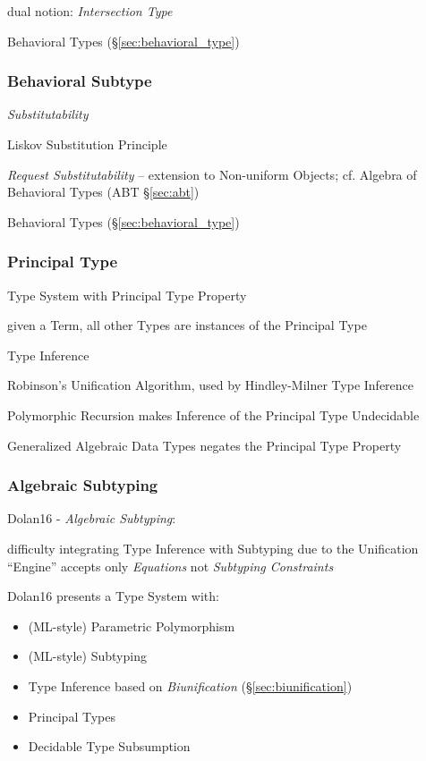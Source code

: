 
dual notion: \emph{Intersection Type}

\fist Behavioral Types (\S\ref{sec:behavioral_type})



\subsubsection{Behavioral Subtype}\label{sec:behavioral_subtype}

\emph{Substitutability}

Liskov Substitution Principle

\emph{Request Substitutability} -- extension to Non-uniform Objects;
cf. Algebra of Behavioral Types (ABT \S\ref{sec:abt})

\fist Behavioral Types (\S\ref{sec:behavioral_type})



\subsubsection{Principal Type}\label{sec:principal_type}

Type System with Principal Type Property

given a Term, all other Types are instances of the Principal Type

Type Inference

Robinson's Unification Algorithm, used by Hindley-Milner Type
Inference

Polymorphic Recursion makes Inference of the Principal Type Undecidable

Generalized Algebraic Data Types negates the Principal Type Property



\subsubsection{Algebraic Subtyping}\label{sec:algebraic_subtyping}

Dolan16 - \emph{Algebraic Subtyping}:

difficulty integrating Type Inference with Subtyping due to the
Unification ``Engine'' accepts only \emph{Equations} not
\emph{Subtyping Constraints}

Dolan16 presents a Type System with:
\begin{itemize}
  \item (ML-style) Parametric Polymorphism
  \item (ML-style) Subtyping
  \item Type Inference based on \emph{Biunification}
    (\S\ref{sec:biunification})
  \item Principal Types
  \item Decidable Type Subsumption
\end{itemize}

